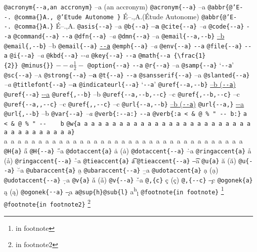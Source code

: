 \documentclass{book}
\newcommand\Texinfocommandstyletextcite[1]{{\normalfont{}\textsl{#1}}}%
\newcommand\Texinfocommandstyletextkbd[1]{{\ttfamily\textsl{#1}}}%
\newcommand\Texinfocommandstyletextvar[1]{{\normalfont{}\textsl{#1}}}%
\renewcommand{\_}{\Texinfounderscore\discretionary{}{}{}}
\begin{document}
\begin{titlepage}
\texttt{@acronym\{{-}{-}a,an accronym\}} --a (an accronym)
\texttt{@acronym\{{-}{-}a\}} --a
\texttt{@abbr\{@'E{-}{-}.\ @comma\{\}A.,\ @'Etude Autonome \}} \'{E}--.\@ ,A.\@ (\'{E}tude Autonome)
\texttt{@abbr\{@'E{-}{-}.\ @comma\{\}A.\}} \'{E}--.\@ ,A.\@
\texttt{@asis\{{-}{-}a\}} --a
\texttt{@b\{{-}{-}a\}} \textbf{--a}
\texttt{@cite\{{-}{-}a\}} \Texinfocommandstyletextcite{--a}
\texttt{@code\{{-}{-}a\}} \texttt{{-}{-}a}
\texttt{@command\{{-}{-}a\}} \texttt{{-}{-}a}
\texttt{@dfn\{{-}{-}a\}} \textsl{--a}
\texttt{@dmn\{{-}{-}a\}} \thinspace --a
\texttt{@email\{{-}{-}a,{-}{-}b\}} \href{mailto:--a}{--b}
\texttt{@email\{,{-}{-}b\}} --b
\texttt{@email\{{-}{-}a\}} \href{mailto:--a}{\nolinkurl{--a}}
\texttt{@emph\{{-}{-}a\}} \emph{--a}
\texttt{@env\{{-}{-}a\}} \texttt{{-}{-}a}
\texttt{@file\{{-}{-}a\}} \texttt{{-}{-}a}
\texttt{@i\{{-}{-}a\}} \textit{--a}
\texttt{@kbd\{{-}{-}a\}} \Texinfocommandstyletextkbd{{-}{-}a}
\texttt{@key\{{-}{-}a\}} \texttt{{-}{-}a}
\texttt{@math\{{-}{-}a \{\textbackslash{}frac\{1\}\{2\}\}\ @minus\{\}\}} $--a {\frac{1}{2}} -$
\texttt{@option\{{-}{-}a\}} \texttt{{-}{-}a}
\texttt{@r\{{-}{-}a\}} \textnormal{--a}
\texttt{@samp\{{-}{-}a\}} `\texttt{{-}{-}a}'
\texttt{@sc\{{-}{-}a\}} \textsc{--a}
\texttt{@strong\{{-}{-}a\}} \textbf{--a}
\texttt{@t\{{-}{-}a\}} \texttt{{-}{-}a}
\texttt{@sansserif\{{-}{-}a\}} \textsf{--a}
\texttt{@slanted\{{-}{-}a\}} \textsl{--a}
\texttt{@titlefont\{{-}{-}a\}} {\huge \bfseries --a}
\texttt{@indicateurl\{{-}{-}a\}} `\texttt{{-}{-}a}'
\texttt{@uref\{{-}{-}a,{-}{-}b\}} \href{--a}{--b (\nolinkurl{--a})}
\texttt{@uref\{{-}{-}a\}} \url{--a}
\texttt{@uref\{,{-}{-}b\}} --b
\texttt{@uref\{{-}{-}a,{-}{-}b,{-}{-}c\}} --c
\texttt{@uref\{,{-}{-}b,{-}{-}c\}} --c
\texttt{@uref\{{-}{-}a{,}{,}{-}{-}c\}} --c
\texttt{@uref\{{,}{,}{-}{-}c\}} --c
\texttt{@url\{{-}{-}a,{-}{-}b\}} \href{--a}{--b (\nolinkurl{--a})}
\texttt{@url\{{-}{-}a,\}} \url{--a}
\texttt{@url\{,{-}{-}b\}} --b
\texttt{@var\{{-}{-}a\}} \Texinfocommandstyletextvar{--a}
\texttt{@verb\{:{-}{-}a:\}} \verb:--a:
\texttt{@verb\{:a  < \& @\ \% " {-}{-}    b:\}} \verb:a  < & @ % " --    b:
\texttt{@w\{a a a a a a a a a a a a a a a a a a a a a a a a a a a a a a a a a a a\}} \hbox{a a a a a a a a a a a a a a a a a a a a a a a a a a a a a a a a a a a}
\texttt{@H\{a\}} \H{a}
\texttt{@H\{{-}{-}a\}} \H{--a}
\texttt{@dotaccent\{a\}} \.{a} (ȧ)
\texttt{@dotaccent\{{-}{-}a\}} \.{--a}
\texttt{@ringaccent\{a\}} \r{a} (å)
\texttt{@ringaccent\{{-}{-}a\}} \r{--a}
\texttt{@tieaccent\{a\}} \t{a}
\texttt{@tieaccent\{{-}{-}a\}} \t{--a}
\texttt{@u\{a\}} \u{a} (ă)
\texttt{@u\{{-}{-}a\}} \u{--a}
\texttt{@ubaraccent\{a\}} \b{a}
\texttt{@ubaraccent\{{-}{-}a\}} \b{--a}
\texttt{@udotaccent\{a\}} \d{a} (ạ)
\texttt{@udotaccent\{{-}{-}a\}} \d{--a}
\texttt{@v\{a\}} \v{a} (ǎ)
\texttt{@v\{{-}{-}a\}} \v{--a}
\texttt{@,\{c\}} \c{c} (ç)
\texttt{@,\{{-}{-}c\}} \c{--c}
\texttt{@ogonek\{a\}} \k{a} (ą)
\texttt{@ogonek\{{-}{-}a\}} \k{--a}
\texttt{a@sup\{h\}@sub\{l\}} a\textsuperscript{h}\textsubscript{l}
\texttt{@footnote\{in footnote\}} \footnote{in footnote}
\texttt{@footnote\{in footnote2\}} \footnote{in footnote2}


\end{titlepage}
\end{document}
